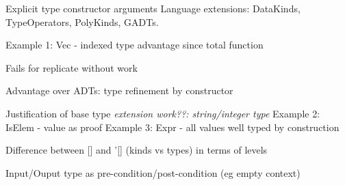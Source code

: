
\cite{GADTs}
Explicit type constructor arguments
Language extensions:
DataKinds, TypeOperators, PolyKinds, GADTs.

Example 1: Vec - indexed type advantage since total function

Fails for replicate without work \cite{DependentHaskell}

Advantage over ADTs: type refinement by constructor

Justification of base type \textit{extension work??: string/integer type}
Example 2: IsElem - value as proof
Example 3: Expr - all values well typed by construction

Difference between [] and '[] (kinds vs types) in terms of levels

Input/Ouput type as pre-condition/post-condition (eg empty context)
